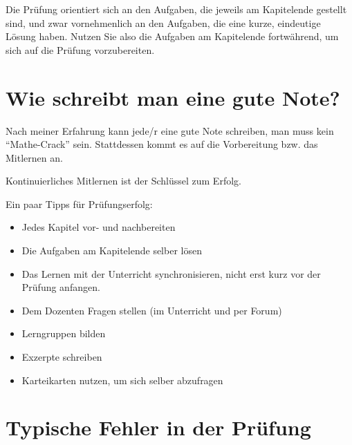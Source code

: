\documentclass[
  a4paper,
  DIV=11]{scrreprt}
\providecommand{\tightlist}{%
  \setlength{\itemsep}{0pt}\setlength{\parskip}{0pt}}\usepackage{longtable,booktabs,array}
\theoremstyle{definition}
\theoremstyle{remark}
\begin{document}
Die Prüfung orientiert sich an den Aufgaben, die jeweils am Kapitelende
gestellt sind, und zwar vornehmenlich an den Aufgaben, die eine kurze,
eindeutige Lösung haben. Nutzen Sie also die Aufgaben am Kapitelende
fortwährend, um sich auf die Prüfung vorzubereiten.

\hypertarget{wie-schreibt-man-eine-gute-note}{%
\section{Wie schreibt man eine gute
Note?}\label{wie-schreibt-man-eine-gute-note}}

Nach meiner Erfahrung kann jede/r eine gute Note schreiben, man muss
kein ``Mathe-Crack'' sein. Stattdessen kommt es auf die Vorbereitung
bzw. das Mitlernen an.

\begin{tcolorbox}[enhanced jigsaw, title=\textcolor{quarto-callout-important-color}{\faExclamation}\hspace{0.5em}{Wichtig}, bottomtitle=1mm, bottomrule=.15mm, titlerule=0mm, colbacktitle=quarto-callout-important-color!10!white, colframe=quarto-callout-important-color-frame, leftrule=.75mm, left=2mm, toprule=.15mm, colback=white, arc=.35mm, breakable, toptitle=1mm, opacityback=0, rightrule=.15mm, coltitle=black, opacitybacktitle=0.6]

Kontinuierliches Mitlernen ist der Schlüssel zum Erfolg.

\end{tcolorbox}

Ein paar Tipps für Prüfungserfolg:

\begin{itemize}
\tightlist
\item
  Jedes Kapitel vor- und nachbereiten
\item
  Die Aufgaben am Kapitelende selber lösen
\item
  Das Lernen mit der Unterricht synchronisieren, nicht erst kurz vor der
  Prüfung anfangen.
\item
  Dem Dozenten Fragen stellen (im Unterricht und per Forum)
\item
  Lerngruppen bilden
\item
  Exzerpte schreiben
\item
  Karteikarten nutzen, um sich selber abzufragen
\end{itemize}

\hypertarget{typische-fehler-in-der-pruxfcfung}{%
\section{Typische Fehler in der
Prüfung}\label{typische-fehler-in-der-pruxfcfung}}
\end{document}
